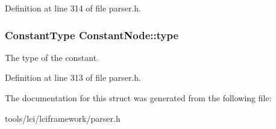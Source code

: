 Definition at line 314 of file parser.\-h.

\hypertarget{struct_constant_node_ae0c5b58398f2ff9a476628ea34858893}{
\subsubsection[{type}]{\setlength{\rightskip}{0pt plus 5cm}Constant\-Type {\bf Constant\-Node\-::type}}}\label{struct_constant_node_ae0c5b58398f2ff9a476628ea34858893}
The type of the constant. 

Definition at line 313 of file parser.\-h.



The documentation for this struct was generated from the following file\-:\begin{DoxyCompactItemize}
\item 
tools/lci/lciframework/parser.\-h\end{DoxyCompactItemize}
